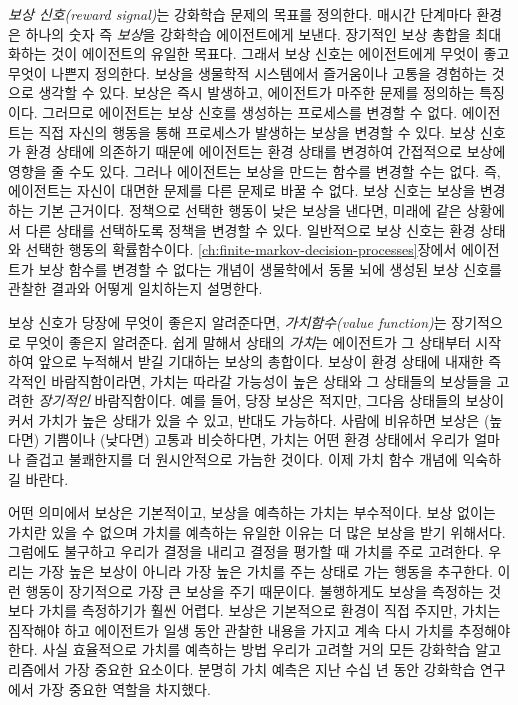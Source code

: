\emph{보상 신호(reward signal)}는 강화학습 문제의 목표를 정의한다. 매시간
단계마다 환경은 하나의 숫자 즉 \emph{보상}을 강화학습 에이전트에게 보낸다.
장기적인 보상 총합을 최대화하는 것이 에이전트의 유일한 목표다. 그래서 보상
신호는 에이전트에게 무엇이 좋고 무엇이 나쁜지 정의한다. 보상을 생물학적
시스템에서 즐거움이나 고통을 경험하는 것으로 생각할 수 있다. 보상은 즉시
발생하고, 에이전트가 마주한 문제를 정의하는 특징이다. 그러므로 에이전트는 보상
신호를 생성하는 프로세스를 변경할 수 없다. 에이전트는 직접 자신의 행동을 통해
프로세스가 발생하는 보상을 변경할 수 있다. 보상 신호가 환경 상태에 의존하기
때문에 에이전트는 환경 상태를 변경하여 간접적으로 보상에 영향을 줄 수도 있다. 
그러나 에이전트는 보상을 만드는 함수를 변경할 수는 없다. 즉, 에이전트는 자신이
대면한 문제를 다른 문제로 바꿀 수 없다. 보상 신호는 보상을 변경하는 기본
근거이다. 정책으로 선택한 행동이 낮은 보상을 낸다면, 미래에 같은 상황에서 다른
상태를 선택하도록 정책을 변경할 수 있다. 일반적으로 보상 신호는 환경 상태와
선택한 행동의 확률함수이다. \ref{ch:finite-markov-decision-processes}장에서
에이전트가 보상 함수를 변경할 수 없다는 개념이 생물학에서 동물 뇌에 생성된 보상
신호를 관찰한 결과와 어떻게 일치하는지 설명한다.


보상 신호가 당장에 무엇이 좋은지 알려준다면, \emph{가치함수(value function)}는
장기적으로 무엇이 좋은지 알려준다. 쉽게 말해서 상태의 \emph{가치}는 에이전트가
그 상태부터 시작하여 앞으로 누적해서 받길 기대하는 보상의 총합이다. 보상이 환경
상태에 내재한 즉각적인 바람직함이라면, 가치는 따라갈 가능성이 높은 상태와 그
상태들의 보상들을 고려한 \emph{장기적인} 바람직함이다. 예를 들어, 당장 보상은
적지만, 그다음 상태들의 보상이 커서 가치가 높은 상태가 있을 수 있고, 반대도
가능하다. 사람에 비유하면 보상은 (높다면) 기쁨이나 (낮다면) 고통과 비슷하다면,
가치는 어떤 환경 상태에서 우리가 얼마나 즐겁고 불쾌한지를 더 원시안적으로 가늠한
것이다. 이제 가치 함수 개념에 익숙하길 바란다.

어떤 의미에서 보상은 기본적이고, 보상을 예측하는 가치는 부수적이다. 보상 없이는
가치란 있을 수 없으며 가치를 예측하는 유일한 이유는 더 많은 보상을 받기
위해서다. 그럼에도 불구하고 우리가 결정을 내리고 결정을 평가할 때 가치를 주로
고려한다. 우리는 가장 높은 보상이 아니라 가장 높은 가치를 주는 상태로 가는
행동을 추구한다. 이런 행동이 장기적으로 가장 큰 보상을 주기 때문이다. 불행하게도
보상을 측정하는 것보다 가치를 측정하기가 훨씬 어렵다. 보상은 기본적으로 환경이
직접 주지만, 가치는 짐작해야 하고 에이전트가 일생 동안 관찰한 내용을 가지고 계속
다시 가치를 추정해야 한다. 사실 효율적으로 가치를 예측하는 방법 우리가 고려할
거의 모든 강화학습 알고리즘에서 가장 중요한 요소이다. 분명히 가치 예측은 지난
수십 년 동안 강화학습 연구에서 가장 중요한 역할을 차지했다.

